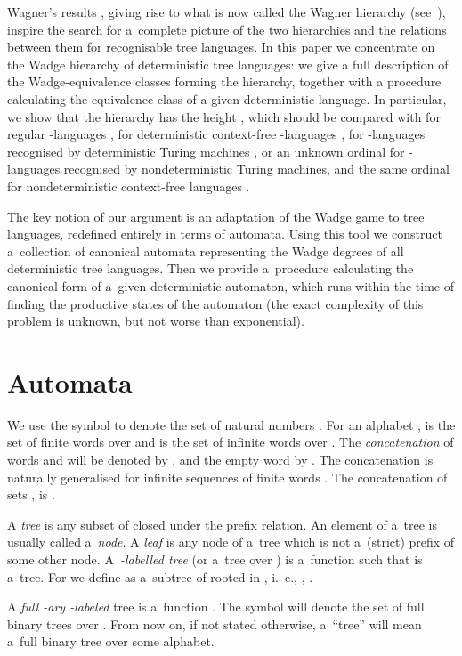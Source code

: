 \documentclass{LMCS}
\begin{document}
Wagner's results \cite{wagner0,wagner}, giving rise to what is now
called the Wagner hierarchy (see~\cite{perrin}), inspire the search
for a~complete picture of the two hierarchies and the relations
between them for recognisable tree languages. In this paper we
concentrate on the Wadge hierarchy of deterministic tree languages: we give a
full description of the Wadge-equivalence classes forming the
hierarchy, together with a procedure calculating the equivalence class
of a given deterministic language. In particular, we show that the hierarchy has the height , which should be compared with  for regular -languages \cite{wagner},  for deterministic context-free -languages \cite{contextfree},  for -languages recognised by deterministic Turing machines \cite{selivanov}, or an unknown ordinal  for -languages recognised by nondeterministic Turing machines, and the same ordinal  for nondeterministic context-free languages \cite{finkel}.


The key notion of our argument is an adaptation of the Wadge game to
tree languages, redefined entirely in terms of automata. Using this
tool we construct a~collection of canonical automata representing the
Wadge degrees of all deterministic tree languages. Then we provide a~procedure calculating the canonical form of a~given deterministic automaton, which runs within the time of finding the productive states of the automaton (the exact complexity of this problem is unknown, but not worse than exponential).


\section{Automata}\label{sect:automata}

We use the symbol  to denote the set of natural numbers . For an alphabet ,   is the set of finite words over  and  is the set of infinite words over . The {\em concatenation}  of words  and  will be denoted by , and the empty word by . The concatenation is naturally generalised for infinite sequences of finite words . The concatenation of sets ,  is .


A {\em tree}  is any subset of  closed under the prefix relation. An element of a~tree is usually called a~{\em node}.  A {\em leaf}  is any node of a~tree which is not a~(strict) prefix of some other node. A~{\em -labelled tree}  (or a~tree over ) is a~function  such that  is a~tree. For  we define   as a~subtree of  rooted in , i.~e., , .

A {\em full -ary -labeled}  tree is a~function . The symbol  will denote the set of full binary trees over . From now on, if not stated otherwise, a~``tree'' will mean a~full binary tree over some alphabet. 
\end{document}
